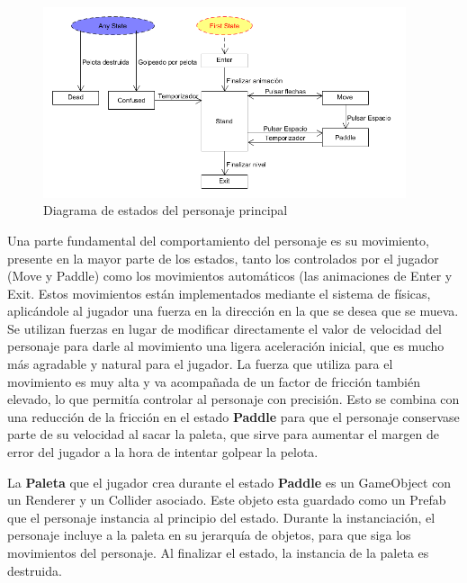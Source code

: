\begin{figure}[h]
	\includegraphics[width=0.95\textwidth]{images/estructura/fisica/player}
	\centering
	\caption{Diagrama de estados del personaje principal}
	\label{player}
\end{figure}

Una parte fundamental del comportamiento del personaje es su movimiento, presente en la mayor parte de los estados, tanto los controlados por el jugador (Move y Paddle) como los movimientos automáticos (las animaciones de Enter y Exit. Estos movimientos están implementados mediante el sistema de físicas, aplicándole al jugador una fuerza en la dirección en la que se desea que se mueva. Se utilizan fuerzas en lugar de modificar directamente el valor de velocidad del personaje para darle al movimiento una ligera aceleración inicial, que es mucho más agradable y natural para el jugador. La fuerza que utiliza para el movimiento es muy alta y va acompañada de un factor de fricción también elevado, lo que permitía controlar al personaje con precisión. Esto se combina con una reducción de la fricción en el estado \textbf{Paddle} para que el personaje conservase parte de su velocidad al sacar la paleta, que sirve para aumentar el margen de error del jugador a la hora de intentar golpear la pelota.

La \textbf{Paleta} que el jugador crea durante el estado \textbf{Paddle} es un GameObject con un Renderer y un Collider asociado. Este objeto esta guardado como un Prefab que el personaje instancia al principio del estado. Durante la instanciación, el personaje incluye a la paleta en su jerarquía de objetos, para que siga los movimientos del personaje. Al finalizar el estado, la instancia de la paleta es destruida.

